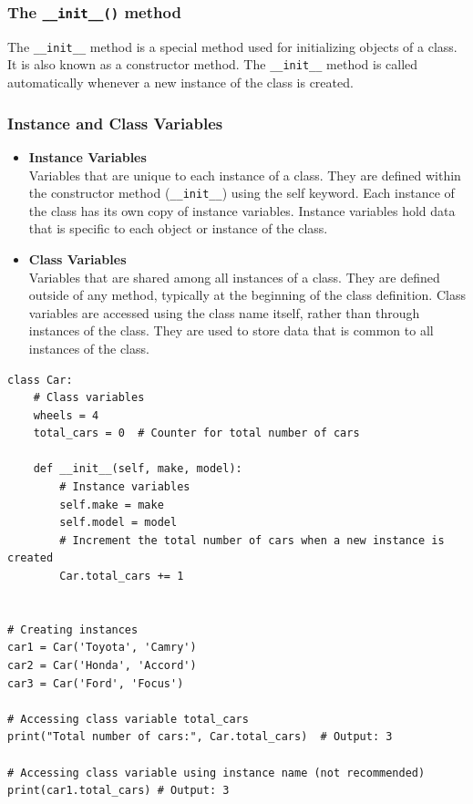 \subsubsection{The \texttt{\_\_init\_\_()} method}

The \texttt{\_\_init\_\_} method is a special method used for initializing objects of a class. It is also known as a constructor method. The \texttt{\_\_init\_\_} method is called automatically whenever a new instance of the class is created.

\newpage
\subsubsection{Instance and Class Variables}

\begin{itemize}
\item \textbf{Instance Variables}\\
Variables that are unique to each instance of a class. They are defined within the constructor method (\texttt{\_\_init\_\_}) using the self keyword. Each instance of the class has its own copy of instance variables. Instance variables hold data that is specific to each object or instance of the class.

\item  \textbf{Class Variables}\\
Variables that are shared among all instances of a class. They are defined outside of any method, typically at the beginning of the class definition. Class variables are accessed using the class name itself, rather than through instances of the class. They are used to store data that is common to all instances of the class.
\end{itemize}

\begin{codebox}
\begin{verbatim}
class Car:
    # Class variables
    wheels = 4
    total_cars = 0  # Counter for total number of cars

    def __init__(self, make, model):
        # Instance variables
        self.make = make
        self.model = model
        # Increment the total number of cars when a new instance is created
        Car.total_cars += 1


# Creating instances
car1 = Car('Toyota', 'Camry')
car2 = Car('Honda', 'Accord')
car3 = Car('Ford', 'Focus')

# Accessing class variable total_cars
print("Total number of cars:", Car.total_cars)  # Output: 3

# Accessing class variable using instance name (not recommended)
print(car1.total_cars) # Output: 3
\end{verbatim}
\end{codebox}

